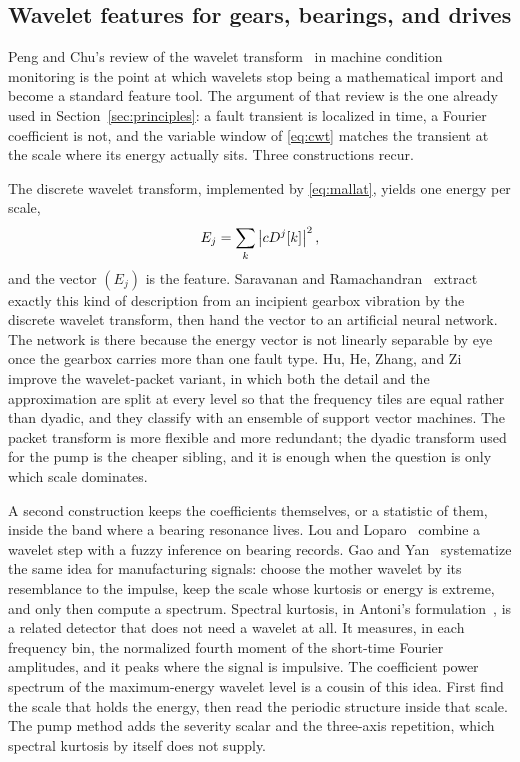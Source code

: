 \subsection{Wavelet features for gears, bearings, and drives}

Peng and Chu's review of the wavelet transform~\cite{peng2004,jardine2006} in machine condition monitoring is the point at which wavelets stop being a mathematical import and become a standard feature tool.
The argument of that review is the one already used in Section~\ref{sec:principles}: a fault transient is localized in time, a Fourier coefficient is not, and the variable window of \eqref{eq:cwt} matches the transient at the scale where its energy actually sits.
Three constructions recur.

The discrete wavelet transform, implemented by \eqref{eq:mallat}, yields one energy per scale,
\begin{equation}
E_{j}=\sum_{k}\left\lvert cD^{j}[k] \right\rvert^{2},
\label{eq:scaleenergy}
\end{equation}
and the vector \((E_{j})\) is the feature.
Saravanan and Ramachandran~\cite{saravanan2010} extract exactly this kind of description from an incipient gearbox vibration by the discrete wavelet transform, then hand the vector to an artificial neural network.
The network is there because the energy vector is not linearly separable by eye once the gearbox carries more than one fault type.
Hu, He, Zhang, and Zi~\cite{hu2007} improve the wavelet-packet variant, in which both the detail and the approximation are split at every level so that the frequency tiles are equal rather than dyadic, and they classify with an ensemble of support vector machines.
The packet transform is more flexible and more redundant; the dyadic transform used for the pump is the cheaper sibling, and it is enough when the question is only which scale dominates.

A second construction keeps the coefficients themselves, or a statistic of them, inside the band where a bearing resonance lives.
Lou and Loparo~\cite{lou2004} combine a wavelet step with a fuzzy inference on bearing records.
Gao and Yan~\cite{gao2011} systematize the same idea for manufacturing signals: choose the mother wavelet by its resemblance to the impulse, keep the scale whose kurtosis or energy is extreme, and only then compute a spectrum.
Spectral kurtosis, in Antoni's formulation~\cite{antoni2006}, is a related detector that does not need a wavelet at all.
It measures, in each frequency bin, the normalized fourth moment of the short-time Fourier amplitudes, and it peaks where the signal is impulsive.
The coefficient power spectrum of the maximum-energy wavelet level is a cousin of this idea.
First find the scale that holds the energy, then read the periodic structure inside that scale.
The pump method adds the severity scalar and the three-axis repetition, which spectral kurtosis by itself does not supply.

